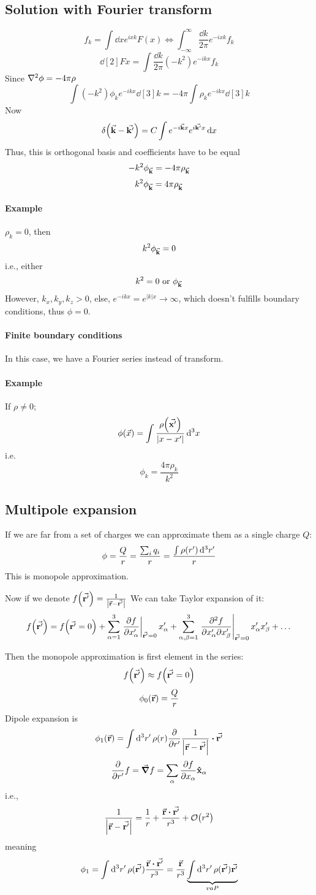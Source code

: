 \subsection{Solution with Fourier transform}
$$f_k = \int \dd{x} e^{ixk} F(x) \iff \int_{-\infty}^\infty \frac{\dd{k}}{2\pi} e^{-ixk} f_k $$
$$\dd[2]{F}{x} = \int  \frac{\dd{k}}{2\pi} (-k^2) e^{-ikx}  f_k$$
Since $\laplacian{\phi} = -4\pi \rho$
$$\int (-k^2) \phi_k e^{-ikx} \dd[3]{k} = -4\pi \int \rho_k e^{-ikx} \dd[3]{k}$$
Now
$$\delta\qty(\va{k} - \va{k'}) = C\int e^{-i \va{k} x} e^{i\va{k'} x} \dd{x}$$
Thus, this is orthogonal basis and coefficients have to be equal
$$-k^2 \phi_{\va{k}} = -4\pi \rho_{\va{k}}$$
$$k^2 \phi_{\va{k}} = 4\pi \rho_{\va{k}}$$
\paragraph{Example}
$\rho_k = 0$, then
$$k^2 \phi_{\va{k}} = 0$$
i.e., either $$k^2 =0 \text{ or } \phi_{\va{k}}$$
However, $k_x, k_y, k_z > 0$, else, $e^{-ikx} = e^{|k|x} \to \infty$, which doesn't fulfills boundary conditions, thus $\phi = 0$.
\paragraph{Finite boundary conditions}
In this case, we have a Fourier series instead of transform.
\paragraph{Example}
If $\rho \neq 0$;
$$\phi (\vec{x}) = \int \frac{\rho\qty(\va{x'})}{\qty|x-x'|} \dd[3]{x}$$
i.e.
$$\phi_k = \frac{4\pi \rho_k}{k^2}$$

\subsection{Multipole expansion}
If we are far from a set of charges we can approximate them as a single charge $Q$:
$$\phi = \frac{Q}{r} = \frac{\sum_i q_i}{r} = \frac{\int \rho\qty(r') \dd[3]{r'}}{r}$$
This is monopole approximation.

Now if we denote $f\qty(\va{r'}) = \frac{1}{\qty|\va{r} -\va{r'}|}$
We can take Taylor expansion of it:
$$f\qty(\va{r'}) = f\qty(\va{r'} = 0)  + \sum_{\alpha=1}^{3} \eval{\pdv{f}{x'_\alpha}}_{\va{r'} =0} x'_\alpha + \sum_{\alpha, \beta = 1}^{3} \eval{\pdv{f}{x'_\alpha}{x'_\beta}}_{\va{r'} =0} x'_\alpha x'_\beta+ \dots$$

Then the monopole approximation is first element in the series:
$$f\qty(\va{r'}) \approx f\qty(\va{r'} = 0)$$
$$\phi_0\qty(\va{r}) = \frac{Q}{r}$$
Dipole expansion is
$$\phi_1\qty(\va{r}) = \int \dd[3]{r'} \rho(r) \pdv{r'} \frac{1}{\qty|\va{r}-\va{r'}|} \vdot \va{r'} $$
$$\pdv{r'} f = \grad{f} = \sum_{\alpha}  \pdv{f}{x_\alpha} \vu{x}_\alpha$$
i.e.,
$$\frac{1}{\qty|\va{r}-\va{r'}|} = \frac{1}{r} + \frac{\va{r} \vdot \va{r'}}{r^3} + \order{r^2}$$
meaning
$$\phi_1 = \int \dd[3]{r'} \rho(\va{r'}) \frac{\va{r} \vdot \va{r'}}{r^3}  =  \frac{\va{r}}{r^3} \underbrace{ \int \dd[3]{r'} \rho(\va{r'}) \va{r'} }_{va{P}}$$

